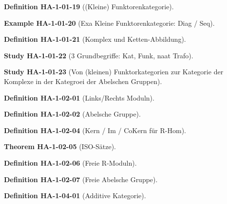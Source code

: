 \documentclass[10pt, letterpaper]{article}
\newcommand{\CustomHeading}[3]{%
  \par\medskip\noindent%
  \textbf{#1 #2} \textnormal{(#3)}.\enskip%
}
\newenvironment{DEF}[2]{\CustomHeading{Definition}{#1}{#2}}{}
\newenvironment{THEO}[2]{\CustomHeading{Theorem}{#1}{#2}}{}
\newenvironment{EXA}[2]{\CustomHeading{Example}{#1}{#2}}{}
\newenvironment{STUD}[2]{\CustomHeading{Study}{#1}{#2}}{}
\begin{document}
\begin{DEF}{HA-1-01-19}{(Kleine) Funktorenkategorie}
\end{DEF}

\begin{EXA}{HA-1-01-20}{Exa Kleine Funktorenkategorie: Diag / Seq}
\end{EXA}

\begin{DEF}{HA-1-01-21}{Komplex und Ketten-Abbildung}
\end{DEF}

\begin{STUD}{HA-1-01-22}{3 Grundbegriffe: Kat, Funk, naat Trafo}
\end{STUD}

\begin{STUD}{HA-1-01-23}{Von (kleinen) Funktorkategorien zur Kategorie der Komplexe in der Kategroei der Abelschen Gruppen}
\end{STUD}

\begin{DEF}{HA-1-02-01}{Links/Rechts Moduln}
\end{DEF}

\begin{DEF}{HA-1-02-02}{Abelsche Gruppe}
\end{DEF}

\begin{DEF}{HA-1-02-04}{Kern / Im / CoKern für R-Hom}
\end{DEF}

\begin{THEO}{HA-1-02-05}{ISO-Sätze}
\end{THEO}

\begin{DEF}{HA-1-02-06}{Freie R-Moduln}
\end{DEF}

\begin{DEF}{HA-1-02-07}{Freie Abelsche Gruppe}
\end{DEF}

\begin{DEF}{HA-1-04-01}{Additive Kategorie}
\end{DEF}
\end{document}
